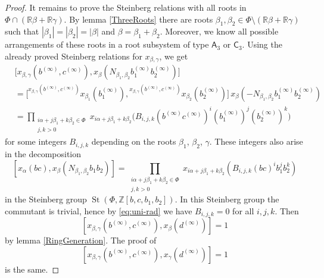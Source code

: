 \documentclass{article}
\numberwithin{equation}{section}
\theoremstyle{definition}
\theoremstyle{remark}
\DeclareMathOperator\St{St}
\newcommand{\up}[2]{{^{#1}\!{#2}}}
\newcommand{\rA}{\mathsf{A}}
\newcommand{\rC}{\mathsf{C}}
\begin{document}
\begin{proof}
 It remains to prove the Steinberg relations with all roots in \(\Phi \cap (\mathbb R \beta + \mathbb R \gamma)\). By lemma \ref{ThreeRoots} there are roots \(\beta_1, \beta_2 \in \Phi \setminus (\mathbb R \beta + \mathbb R \gamma)\) such that \(|\beta_1| = |\beta_2| = |\beta|\) and \(\beta = \beta_1 + \beta_2\). Moreover, we know all possible arrangements of these roots in a root subsystem of type \(\rA_3\) or \(\rC_3\). Using the already proved Steinberg relations for \(x_{\beta, \gamma}\), we get
 \begin{align*}
  &\bigl[x_{\beta, \gamma}(b^{(\infty)}, c^{(\infty)}),
  x_\beta(N_{\beta_1, \beta_2}
   b_1^{(\infty)} b_2^{(\infty)})\bigr]\\
  &= \bigl[\up{x_{\beta, \gamma}(b^{(\infty)}, c^{(\infty)})}
   {x_{\beta_1}(b_1^{(\infty)})},
  \up{x_{\beta, \gamma}(b^{(\infty)}, c^{(\infty)})}
   {x_{\beta_2}(b_2^{(\infty)})}\bigr]\,
  x_\beta(-N_{\beta_1, \beta_2}
   b_1^{(\infty)} b_2^{(\infty)})\\
  &= \prod_{\substack{i\alpha + j\beta_1 + k\beta_2 \in \Phi\\ j, k > 0}}
  x_{i\alpha + j\beta_1 + k\beta_2}\bigl(B_{i, j, k} (b^{(\infty)} c^{(\infty)})^i (b_1^{(\infty)})^j (b_2^{(\infty)})^k\bigr)
 \end{align*}
 for some integers \(B_{i, j, k}\) depending on the roots \(\beta_1\), \(\beta_2\), \(\gamma\). These integers also arise in the decomposition
 \[[x_\alpha(bc), x_\beta(N_{\beta_1, \beta_2} b_1 b_2)] = \prod_{\substack{i\alpha + j\beta_1 + k\beta_2 \in \Phi\\ j, k > 0}}
  x_{i\alpha + j\beta_1 + k\beta_2}(B_{i, j, k} (bc)^i b_1^j b_2^k)\]
 in the Steinberg group \(\St(\Phi, \mathbb Z[b, c, b_1, b_2])\). In this Steinberg group the commutant is trivial, hence by \eqref{eq:uni-rad} we have \(B_{i, j, k} = 0\) for all \(i, j, k\). Then
 \[[x_{\beta, \gamma}(b^{(\infty)}, c^{(\infty)}), x_\beta(d^{(\infty)})] = 1\]
 by lemma \ref{RingGeneration}. The proof of
 \[[x_{\beta, \gamma}(b^{(\infty)}, c^{(\infty)}), x_\gamma(d^{(\infty)})] = 1\]
 is the same.


\end{proof}
\end{document}

